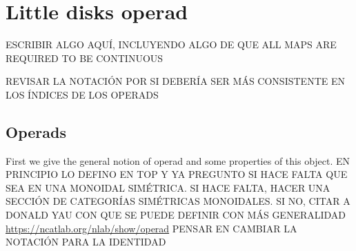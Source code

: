\documentclass[TFM.tex]{subfiles}
\begin{document}
\chapter{Little disks operad}

ESCRIBIR ALGO AQUÍ, INCLUYENDO ALGO DE QUE ALL MAPS ARE REQUIRED TO BE CONTINUOUS

REVISAR LA NOTACIÓN POR SI DEBERÍA SER MÁS CONSISTENTE EN LOS ÍNDICES DE LOS OPERADS


\section{Operads}
First we give the general notion of operad and some properties of this object. EN PRINCIPIO LO DEFINO EN TOP Y YA PREGUNTO SI HACE FALTA QUE SEA EN UNA MONOIDAL SIMÉTRICA. SI HACE FALTA, HACER UNA SECCIÓN DE CATEGORÍAS SIMÉTRICAS MONOIDALES. SI NO, CITAR A DONALD YAU CON QUE SE PUEDE DEFINIR CON MÁS GENERALIDAD
\url{https://ncatlab.org/nlab/show/operad}
%
PENSAR EN CAMBIAR LA NOTACIÓN PARA LA IDENTIDAD
\end{document}
